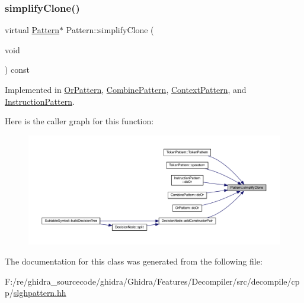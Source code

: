 \subsubsection{\texorpdfstring{simplifyClone()}{simplifyClone()}}
{\footnotesize\ttfamily virtual \mbox{\hyperlink{class_pattern}{Pattern}}$\ast$ Pattern\+::simplify\+Clone (\begin{DoxyParamCaption}\item[{void}]{ }\end{DoxyParamCaption}) const\hspace{0.3cm}{\ttfamily [pure virtual]}}



Implemented in \mbox{\hyperlink{class_or_pattern_ae6db76f35f6dc8661a511c9db40ecfd7}{Or\+Pattern}}, \mbox{\hyperlink{class_combine_pattern_ad6eafd26d824e0e449991267f30d818b}{Combine\+Pattern}}, \mbox{\hyperlink{class_context_pattern_a42838644f963d9b251c0d221c20c8116}{Context\+Pattern}}, and \mbox{\hyperlink{class_instruction_pattern_ad257e6ff03279c9366d7568b011c72a5}{Instruction\+Pattern}}.

Here is the caller graph for this function\+:
\nopagebreak
\begin{figure}[H]
\begin{center}
\leavevmode
\includegraphics[width=350pt]{class_pattern_a9c2c1383d7f836f8af237a03e463d94d_icgraph}
\end{center}
\end{figure}


The documentation for this class was generated from the following file\+:\begin{DoxyCompactItemize}
\item 
F\+:/re/ghidra\+\_\+sourcecode/ghidra/\+Ghidra/\+Features/\+Decompiler/src/decompile/cpp/\mbox{\hyperlink{slghpattern_8hh}{slghpattern.\+hh}}\end{DoxyCompactItemize}
